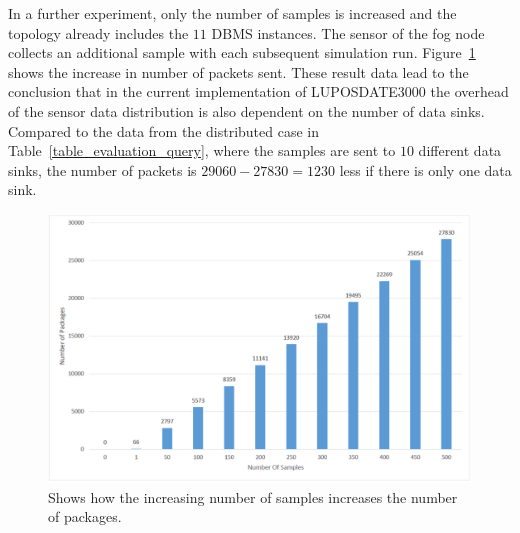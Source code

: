 \documentclass[english,version-2019-11]{uzl-thesis}
\begin{document}
In a further experiment, only the number of samples is increased and the topology already includes the $11$ DBMS instances. The sensor of the fog node collects an additional sample with each subsequent simulation run. Figure~\ref{figure_evaluation_sampling_number} shows the increase in number of packets sent. These result data lead to the conclusion that in the current implementation of LUPOSDATE3000 the overhead of the sensor data distribution is also dependent on the number of data sinks. Compared to the data from the distributed case in Table~\ref{table_evaluation_query}, where the samples are sent to $10$ different data sinks, the number of packets is $29060 - 27830 = 1230$ less if there is only one data sink.
\begin{figure}[htpb]
  \centering
  \includegraphics[scale=0.5]{figure_evaluation_sampling_number.pdf}
  \caption{Shows how the increasing number of samples increases the number of packages.\label{figure_evaluation_sampling_number}}
  
\end{figure}
\end{document}
